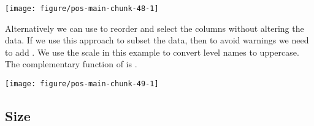 \documentclass[krantz2]{krantz}\usepackage{knitr}%
\begin{document}
\begin{knitrout}\footnotesize
{}\color{fgcolor}\begin{kframe}
\begin{alltt}
 \hlstd{(}\hlstd{(} \hlopt{+}
  \hlstd{(} \hlstd{=} \hlstd{,}  
\end{alltt}
\end{kframe}

{\centering \texttt{[image: figure/pos-main-chunk-48-1]} 

}



\end{knitrout}

Alternatively we can use  to reorder and select the columns without altering the data. If we use this approach to subset the data, then to avoid warnings we need to add . We use the scale in this example to convert level names to uppercase. The complementary function of  is .

\begin{knitrout}\footnotesize
{}\color{fgcolor}\begin{kframe}
\begin{alltt}
  \hlopt{+}
  \hlstd{(} \hlstd{=} \hlstd{,}    \hlstd{=} \hlstd{)} \hlopt{+}
  \hlstd{(} \hlstd{=} \hlstd{(}\hlstd{,} \hlstd{,} \hlstd{),}
   
\end{alltt}
\end{kframe}

{\centering \texttt{[image: figure/pos-main-chunk-49-1]} 

}



\end{knitrout}

\subsection{Size}
\end{document}
